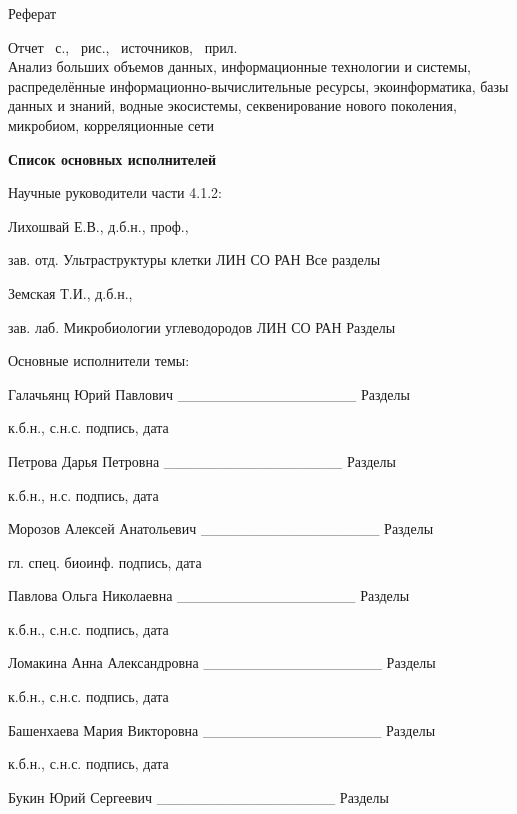 \documentclass[a4paper,12pt,openany,final]{extreport}
\begin{document}
\begin{titlepage}
  \thispagestyle{empty}
  \begin{center}
    {\capfont Реферат}
  \end{center}

Отчет \pageref{LastPage}~с., ~рис., ~источников, ~прил.\\[0.2em]

Анализ больших объемов данных, информационные технологии и системы,
распределённые информационно-вычислительные ресурсы, экоинформатика,
базы данных и знаний, водные экосистемы, секвенирование нового
поколения, микробиом, корреляционные сети
\end{titlepage}
\begin{titlepage}
  \thispagestyle{empty}
\begin{center}\bfseries
  \capfont Список основных исполнителей
  \end{center}

Научные руководители части 4.1.2:

Лихошвай Е.В., д.б.н., проф.,

зав. отд. Ультраструктуры клетки ЛИН СО РАН Все разделы

Земская Т.И., д.б.н.,

зав. лаб. Микробиологии углеводородов ЛИН СО РАН Разделы

Основные исполнители темы:

Галачьянц Юрий Павлович \_\_\_\_\_\_\_\_\_\_\_\_\_\_\_\_\_ Разделы

к.б.н., с.н.с. подпись, дата

Петрова Дарья Петровна \_\_\_\_\_\_\_\_\_\_\_\_\_\_\_\_\_ Разделы

к.б.н., н.с. подпись, дата

Морозов Алексей Анатольевич \_\_\_\_\_\_\_\_\_\_\_\_\_\_\_\_\_ Разделы

гл. спец. биоинф. подпись, дата

Павлова Ольга Николаевна \_\_\_\_\_\_\_\_\_\_\_\_\_\_\_\_\_ Разделы

к.б.н., с.н.с. подпись, дата

Ломакина Анна Александровна \_\_\_\_\_\_\_\_\_\_\_\_\_\_\_\_\_ Разделы

к.б.н., с.н.с. подпись, дата

Башенхаева Мария Викторовна \_\_\_\_\_\_\_\_\_\_\_\_\_\_\_\_\_ Разделы

к.б.н., с.н.с. подпись, дата

Букин Юрий Сергеевич \_\_\_\_\_\_\_\_\_\_\_\_\_\_\_\_\_ Разделы


\end{titlepage}
\end{document}
